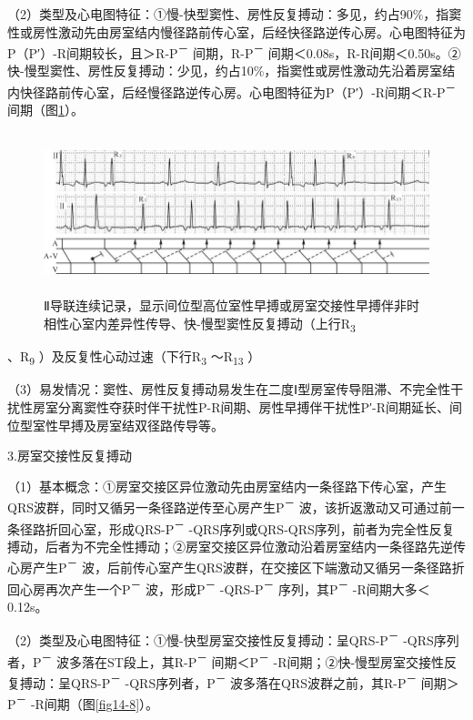 （2）类型及心电图特征：①慢-快型窦性、房性反复搏动：多见，约占90\%，指窦性或房性激动先由房室结内慢径路前传心室，后经快径路逆传心房。心电图特征为P（P′）-R间期较长，且＞R-P\textsuperscript{－}
间期，R-P\textsuperscript{－}
间期＜0.08s，R-R间期＜0.50s。②快-慢型窦性、房性反复搏动：少见，约占10\%，指窦性或房性激动先沿着房室结内快径路前传心室，后经慢径路逆传心房。心电图特征为P（P′）-R间期＜R-P\textsuperscript{－}
间期（图\ref{fig14-7}）。

\begin{figure}[!htbp]
 \centering
 \includegraphics[width=5.77083in,height=1.84375in]{./images/Image00253.jpg}
 \captionsetup{justification=centering}
 \caption{Ⅱ导联连续记录，显示间位型高位室性早搏或房室交接性早搏伴非时相性心室内差异性传导、快-慢型窦性反复搏动（上行R\textsubscript{3}}
 \label{fig14-7}
  \end{figure} 
、R\textsubscript{9} ）及反复性心动过速（下行R\textsubscript{3}
～R\textsubscript{13} ）

（3）易发情况：窦性、房性反复搏动易发生在二度Ⅰ型房室传导阻滞、不完全性干扰性房室分离窦性夺获时伴干扰性P-R间期、房性早搏伴干扰性P′-R间期延长、间位型室性早搏及房室结双径路传导等。

3.房室交接性反复搏动

（1）基本概念：①房室交接区异位激动先由房室结内一条径路下传心室，产生QRS波群，同时又循另一条径路逆传至心房产生P\textsuperscript{－}
波，该折返激动又可通过前一条径路折回心室，形成QRS-P\textsuperscript{－}
-QRS序列或QRS-QRS序列，前者为完全性反复搏动，后者为不完全性搏动；②房室交接区异位激动沿着房室结内一条径路先逆传心房产生P\textsuperscript{－}
波，后前传心室产生QRS波群，在交接区下端激动又循另一条径路折回心房再次产生一个P\textsuperscript{－}
波，形成P\textsuperscript{－} -QRS-P\textsuperscript{－}
序列，其P\textsuperscript{－} -R间期大多＜0.12s。

（2）类型及心电图特征：①慢-快型房室交接性反复搏动：呈QRS-P\textsuperscript{－}
-QRS序列者，P\textsuperscript{－}
波多落在ST段上，其R-P\textsuperscript{－} 间期＜P\textsuperscript{－}
-R间期；②快-慢型房室交接性反复搏动：呈QRS-P\textsuperscript{－}
-QRS序列者，P\textsuperscript{－}
波多落在QRS波群之前，其R-P\textsuperscript{－}
间期＞P\textsuperscript{－} -R间期（图\ref{fig14-8}）。

